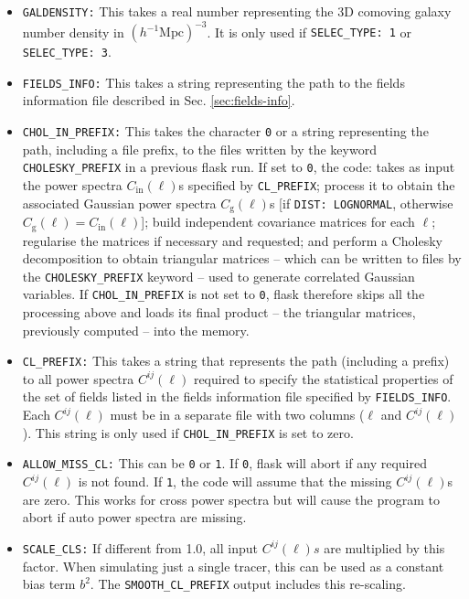 \documentclass[12pt]{book} %
\newcommand{\nv}[1]{\mathrm{#1}}                 %
\begin{document}
\begin{itemize}
\item {\tt GALDENSITY:} This takes a real number representing the 3D comoving galaxy number 
  density in $(h^{-1}\nv{Mpc})^{-3}$. It is only used if {\tt SELEC\_TYPE: 1} or {\tt SELEC\_TYPE: 3}. 

\item {\tt FIELDS\_INFO:} This takes a string representing the path to the fields information file 
  described in Sec. \ref{sec:fields-info}.

\item {\tt CHOL\_IN\_PREFIX:} This takes the character {\tt 0} or a string representing the path, including 
  a file prefix, to the files written by the keyword {\tt CHOLESKY\_PREFIX} in a previous {\sc flask} run. If set to 
  {\tt 0}, the code: takes as input the power spectra $C_{\nv{in}}(\ell)$s specified by {\tt CL\_PREFIX}; 
  process it to obtain the associated Gaussian power spectra $C_{\nv{g}}(\ell)$s [if {\tt DIST: LOGNORMAL}, 
  otherwise $C_{\nv{g}}(\ell)=C_{\nv{in}}(\ell)$]; build independent covariance matrices for each $\ell$; 
  regularise the matrices if necessary and requested; and perform a Cholesky decomposition to obtain 
  triangular matrices -- which can be written to files by the {\tt CHOLESKY\_PREFIX} keyword -- used 
  to generate correlated Gaussian variables. If {\tt CHOL\_IN\_PREFIX} is not set to {\tt 0}, {\sc flask} 
  therefore skips all the processing above and loads its final product -- the triangular matrices, previously
  computed -- into the memory.

\item {\tt CL\_PREFIX:} This takes a string that represents the path (including a prefix) to all 
  power spectra $C^{ij}(\ell)$ required to specify the statistical properties of the set of fields 
  listed in the fields information file specified by {\tt FIELDS\_INFO}. Each $C^{ij}(\ell)$ must 
  be in a separate file with two columns ($\ell$ and $C^{ij}(\ell)$). This string is only used 
  if {\tt CHOL\_IN\_PREFIX} is set to zero.

\item {\tt ALLOW\_MISS\_CL:} This can be {\tt 0} or {\tt 1}. If {\tt 0}, {\sc flask} will abort 
  if any required $C^{ij}(\ell)$ is not found. If {\tt 1}, the code will assume that the missing 
  $C^{ij}(\ell)$s are zero. This works for cross power spectra but will cause the program to abort 
  if auto power spectra are missing.

\item {\tt SCALE\_CLS:} If different from 1.0, all input $C^{ij}(\ell)s$ are multiplied by 
  this factor. When simulating just a single tracer, this can be used as a constant bias term 
  $b^2$. The {\tt SMOOTH\_CL\_PREFIX} output includes this re-scaling.


\end{itemize}
\end{document}
